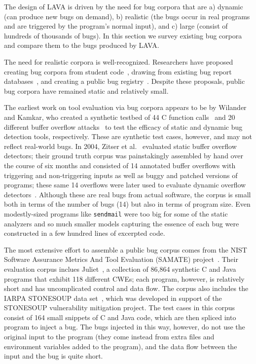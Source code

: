 The design of LAVA is driven by the need for bug corpora that are a) dynamic (can produce new bugs on demand), b) realistic (the bugs occur in real programs and are triggered by the program's normal input), and c) large (consist of hundreds of thousands of bugs). 
In this section we survey existing bug corpora and compare them to the bugs produced by LAVA.

The need for realistic corpora is well-recognized. 
Researchers have proposed creating bug corpora from student code~\cite{Spacco:2005}, drawing from existing bug report databases~\cite{Lu:2005,Meftah:2005},
and creating a public bug registry~\cite{Foster:2005}.
Despite these proposals, public bug corpora have remained static and relatively small.

The earliest work on tool evaluation via bug corpora appears to be by Wilander and Kamkar, who created a synthetic testbed of 44 C function calls~\cite{Wilander:2002} and 20 different buffer overflow attacks~\cite{Wilander:2003} to test the efficacy of static and dynamic bug detection tools, respectively.
These are synthetic test cases, however, and may not reflect real-world bugs.
In 2004, Zitser et al.~\cite{Zitser:2004} evaluated static buffer overflow detectors; their ground truth corpus was painstakingly assembled by hand over the course of six months and consisted of 14 annotated buffer overflows with triggering and non-triggering inputs as well as buggy and patched versions of programs; these same 14 overflows were later used to evaluate dynamic overflow detectors~\cite{Zhivich:2005}.
Although these are real bugs from actual software, the corpus is small both in terms of the number of bugs (14) but also in terms of program size.
Even modestly-sized programs like \verb+sendmail+ were too big for some of the static analyzers and so much smaller models capturing the essence of each bug were constructed in a few hundred lines of excerpted code.

The most extensive effort to assemble a public bug corpus comes from the NIST Software Assurance Metrics And Tool Evaluation (SAMATE)
project~\cite{Kass:2005}. 
Their evaluation corpus inclues Juliet~\cite{Juliet:2012}, a collection of 86,864 synthetic C and Java programs that exhibit 118 different CWEs; each program, however, is relatively short and has uncomplicated control and data flow. 
The corpus also includes the IARPA STONESOUP data set~\cite{SAMATE:2014}, which was developed in support of the STONESOUP vulnerability mitigation project.
The test cases in this corpus consist of 164 small snippets of C and Java code, which are then spliced into program to inject a bug. 
The bugs injected in this way, however, do not use the original input to the program (they come instead from extra files and environment variables added to the program), and the data flow between the input and the bug is quite short.

